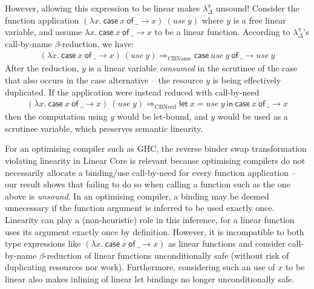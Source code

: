 \documentclass[acmsmall,review,anonymous,screen]{acmart}
\newcommand{\llet}[2]{\mathsf{let}~#1~\mathsf{in}~#2}
\newcommand{\ccase}[2]{\mathsf{case}~#1~\mathsf{of}~#2}
\begin{document}
However, allowing this expression to be linear makes $\lambda^\pi_\Delta$ unsound!
Consider the function application $(\lambda x.~\ccase{x}{\_ \to x})~(use~y)$
where $y$ is a free linear variable, and assume $\lambda x.~\ccase{x}{\_ \to x}$
to be a linear function. According to $\lambda^\pi_\Delta$'s call-by-name
$\beta$-reduction, we have:
\[
\begin{array}{l}
(\lambda x.~\ccase{x}{\_ \to x})~(use~y)
\Longrightarrow_\textrm{CBName}
\ccase{use~y}{\_ \to use~y}
\end{array}
\]
After the reduction, $y$ is a linear variable \emph{consumed} in the scrutinee
of the case that also occurs in the case alternative -- the resource
$y$ is being effectively duplicated.
%
If the application were instead reduced with call-by-need
\[
\begin{array}{l}
(\lambda x.~\ccase{x}{\_ \to x})~(use~y)
\Longrightarrow_\textrm{CBNeed}
\llet{x = use~y}{\ccase{x}{\_ \to x}}
\end{array}
\]
then the computation using $y$ would be let-bound, and $y$ would be used as a
scrutinee variable, which preserves semantic linearity.

For an optimising compiler such as GHC, the reverse binder swap transformation
violating linearity in Linear Core is relevant because optimising
compilers do not necessarily allocate a binding/use call-by-need for
every function application -- our result shows that failing to do so
when calling a function such as the one above is \emph{unsound}.
%
In an optimising compiler, a binding may be deemed unnecessary if the function
argument is inferred to be used exactly once. Linearity can play a
(non-heuristic) role in this inference, for a linear function uses its
argument exactly once by definition.
%
%
However, it is incompatible to both type expressions like $(\lambda
x.~\ccase{x}{\_ \to x})$ as linear functions and consider
call-by-name $\beta$-reduction of linear functions unconditionally
safe (without risk of duplicating resources nor work).
%
Furthermore, considering such an use of $x$ to be linear also makes inlining of
linear let bindings no longer unconditionally safe.

\end{document}
